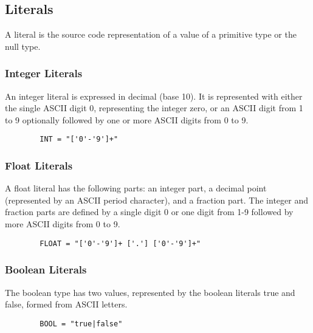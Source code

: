\begin{homeworkProblem}
	
	\subsection{Literals}
	A literal is the source code representation of a value of a primitive type or the null type.
	
	\subsubsection{Integer Literals}
	An integer literal is expressed in decimal (base 10). It is represented with either the single ASCII digit 0, representing the integer zero, or an ASCII digit from 1 to 9 optionally followed by one or more ASCII digits from 0 to 9. 
	
	\begin{verbatim}
		INT = "['0'-'9']+"
	\end{verbatim}
	
	\subsubsection{Float Literals}
	A float literal has the following parts: an integer part, a decimal point (represented by an ASCII period character), and a fraction part. The integer and fraction parts are defined by a single digit 0 or one digit from 1-9 followed by more ASCII digits from 0 to 9.
	\begin{verbatim}
		FLOAT = "['0'-'9']+ ['.'] ['0'-'9']+"
	\end{verbatim}
	
	\subsubsection{Boolean Literals}
	The boolean type has two values, represented by the boolean literals true and false, formed from ASCII letters.
	\begin{verbatim}
		BOOL = "true|false"
	\end{verbatim}
	

\end{homeworkProblem}
